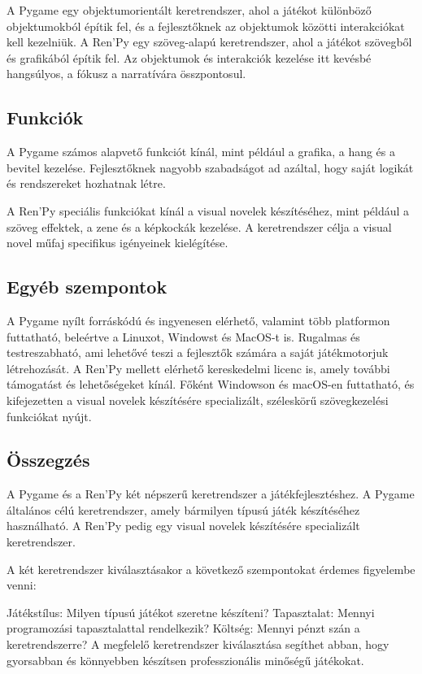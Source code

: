 A Pygame egy objektumorientált keretrendszer, ahol a játékot különböző objektumokból építik fel, és a fejlesztőknek az objektumok közötti interakciókat kell kezelniük.
A Ren'Py egy szöveg-alapú keretrendszer, ahol a játékot szövegből és grafikából építik fel. Az objektumok és interakciók kezelése itt kevésbé hangsúlyos, a fókusz a narratívára összpontosul.

\subsection{Funkciók}

A Pygame számos alapvető funkciót kínál, mint például a grafika, a hang és a bevitel kezelése. Fejlesztőknek nagyobb szabadságot ad azáltal, hogy saját logikát és rendszereket hozhatnak létre.

A Ren'Py speciális funkciókat kínál a visual novelek készítéséhez, mint például a szöveg effektek, a zene és a képkockák kezelése. A keretrendszer célja a visual novel műfaj specifikus igényeinek kielégítése.

\subsection{Egyéb szempontok}

A Pygame nyílt forráskódú és ingyenesen elérhető, valamint több platformon futtatható, beleértve a Linuxot, Windowst és MacOS-t is. Rugalmas és testreszabható, ami lehetővé teszi a fejlesztők számára a saját játékmotorjuk létrehozását.
A Ren'Py mellett elérhető kereskedelmi licenc is, amely további támogatást és lehetőségeket kínál. Főként Windowson és macOS-en futtatható, és kifejezetten a visual novelek készítésére specializált, széleskörű szövegkezelési funkciókat nyújt.

\subsection{Összegzés}

A Pygame és a Ren'Py két népszerű keretrendszer a játékfejlesztéshez. A Pygame általános célú keretrendszer, amely bármilyen típusú játék készítéséhez használható. A Ren'Py pedig egy visual novelek készítésére specializált keretrendszer.

A két keretrendszer kiválasztásakor a következő szempontokat érdemes figyelembe venni:

Játékstílus: Milyen típusú játékot szeretne készíteni?
Tapasztalat: Mennyi programozási tapasztalattal rendelkezik?
Költség: Mennyi pénzt szán a keretrendszerre?
A megfelelő keretrendszer kiválasztása segíthet abban, hogy gyorsabban és könnyebben készítsen professzionális minőségű játékokat.

